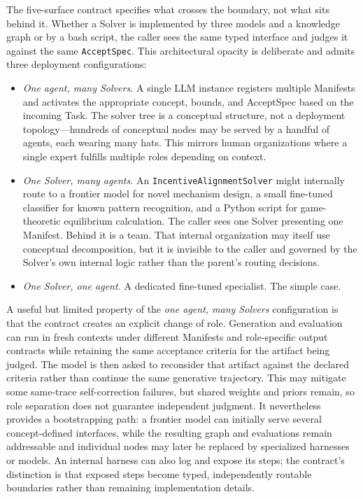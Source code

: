 \documentclass[11pt]{article}
\let\oldtexttt\texttt
\renewcommand{\texttt}[1]{\oldtexttt{\small #1}}
\begin{document}
The five-surface contract specifies what crosses the boundary, not what sits behind it. Whether a Solver is implemented by three models and a knowledge graph or by a bash script, the caller sees the same typed interface and judges it against the same \texttt{AcceptSpec}. This architectural opacity is deliberate and admits three deployment configurations:

\begin{itemize}[leftmargin=*]
\item \emph{One agent, many Solvers.} A single LLM instance registers multiple Manifests and activates the appropriate concept, bounds, and AcceptSpec based on the incoming Task. The solver tree is a conceptual structure, not a deployment topology---hundreds of conceptual nodes may be served by a handful of agents, each wearing many hats. This mirrors human organizations where a single expert fulfills multiple roles depending on context.
\item \emph{One Solver, many agents.} An \texttt{IncentiveAlignmentSolver} might internally route to a frontier model for novel mechanism design, a small fine-tuned classifier for known pattern recognition, and a Python script for game-theoretic equilibrium calculation. The caller sees one Solver presenting one Manifest. Behind it is a team. That internal organization may itself use conceptual decomposition, but it is invisible to the caller and governed by the Solver's own internal logic rather than the parent's routing decisions.
\item \emph{One Solver, one agent.} A dedicated fine-tuned specialist. The simple case.
\end{itemize}

A useful but limited property of the \emph{one agent, many Solvers} configuration is that the contract creates an explicit change of role. Generation and evaluation can run in fresh contexts under different Manifests and role-specific output contracts while retaining the same acceptance criteria for the artifact being judged. The model is then asked to reconsider that artifact against the declared criteria rather than continue the same generative trajectory. This may mitigate some same-trace self-correction failures, but shared weights and priors remain, so role separation does not guarantee independent judgment. It nevertheless provides a bootstrapping path: a frontier model can initially serve several concept-defined interfaces, while the resulting graph and evaluations remain addressable and individual nodes may later be replaced by specialized harnesses or models. An internal harness can also log and expose its steps; the contract's distinction is that exposed steps become typed, independently routable boundaries rather than remaining implementation details.
\end{document}
